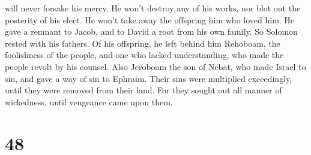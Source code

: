 will never forsake his mercy. He won't destroy any of his works, nor
blot out the posterity of his elect. He won't take away the offspring
him who loved him. He gave a remnant to Jacob, and to David a root from
his own family.  So Solomon rested with his fathers. Of his
offspring, he left behind him Rehoboam, the foolishness of the people,
and one who lacked understanding, who made the people revolt by his
counsel. Also Jeroboam the son of Nebat, who made Israel to sin, and
gave a way of sin to Ephraim.  Their sins were multiplied
exceedingly, until they were removed from their land.  For
they sought out all manner of wickedness, until vengeance came upon
them.

\hypertarget{section-34}{%
\section{48}\label{section-34}}

